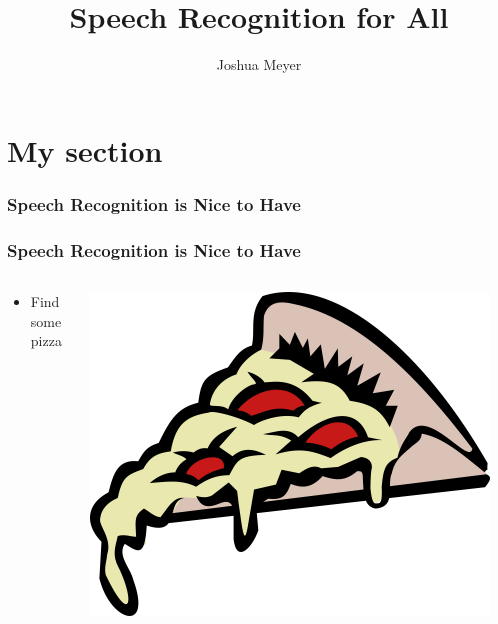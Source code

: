 \documentclass[pdflatex,compress]{beamer}
\title{Speech Recognition for All}
\subtitle{}
\author{Joshua Meyer}
\begin{document}
\maketitle

\section{My section}


\begin{frame}
  \frametitle{Speech Recognition is Nice to Have}
\end{frame}


\begin{frame}
  \frametitle{Speech Recognition is Nice to Have}
  \begin{columns}[onlytextwidth]
    \begin{column}{0.6\textwidth}
      \begin{itemize}
      \item Find some pizza
      \end{itemize}
    \end{column}
    \begin{column}{0.4\textwidth}
      \centering
      \vspace{-.25cm}
      \includegraphics[scale=.125]{pizza.png}\\
      \vspace{2cm}
    \end{column}
​    \end{columns}
\end{frame}
\end{document}

